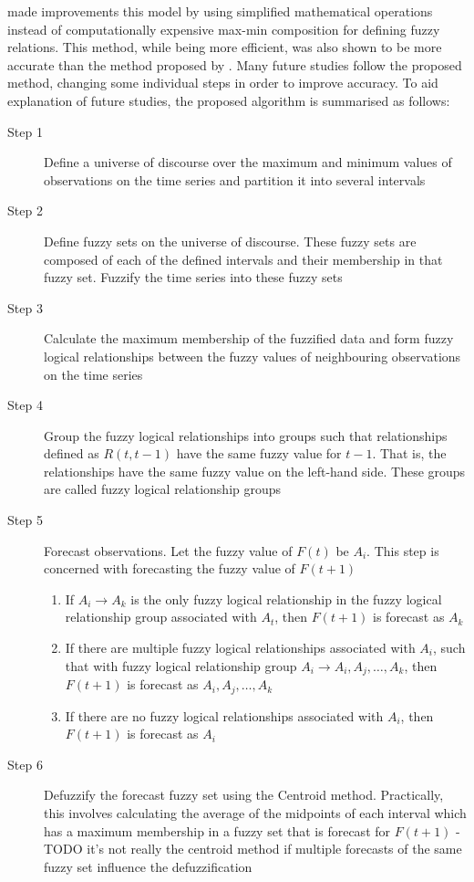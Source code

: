 \documentclass{article}
\theoremstyle{definition}
\begin{document}
\cite{chen1996forecasting} made improvements this model by using simplified mathematical operations instead of computationally expensive max-min composition for defining fuzzy relations. This method, while being more efficient, was also shown to be more accurate than the method proposed by \cite{song1993forecasting}. Many future studies follow the proposed method, changing some individual steps in order to improve accuracy. To aid explanation of future studies, the proposed algorithm is summarised as follows:

\begin{description}
\item[Step 1] Define a universe of discourse over the maximum and minimum values of observations on the time series and partition it into several intervals
\item[Step 2] Define fuzzy sets on the universe of discourse. These fuzzy sets are composed of each of the defined intervals and their membership in that fuzzy set. Fuzzify the time series into these fuzzy sets
\item[Step 3] Calculate the maximum membership of the fuzzified data and form fuzzy logical relationships between the fuzzy values of neighbouring observations on the time series
\item[Step 4] Group the fuzzy logical relationships into groups such that relationships defined as $R(t,t-1)$ have the same fuzzy value for $t-1$. That is, the relationships have the same fuzzy value on the left-hand side. These groups are called fuzzy logical relationship groups
\item[Step 5] Forecast observations. Let the fuzzy value of $F(t)$ be $A_i$. This step is concerned with forecasting the fuzzy value of $F(t+1)$
\begin{enumerate}
\item If  $A_i \rightarrow A_k$ is the only fuzzy logical relationship in the fuzzy logical relationship group associated with $A_t$, then $F(t+1)$ is forecast as $A_k$ 
\item If there are multiple fuzzy logical relationships associated with $A_i$, such that with fuzzy logical relationship group $A_i \rightarrow A_{i}, A_{j}, \ldots, A_{k}$, then $F(t+1)$ is forecast as $A_{i}, A_{j}, \ldots, A_{k}$
\item If there are no fuzzy logical relationships associated with $A_i$, then $F(t+1)$ is forecast as $A_i$
\end{enumerate}
\item[Step 6] Defuzzify the forecast fuzzy set using the Centroid method. Practically, this involves calculating the average of the midpoints of each interval which has a maximum membership in a fuzzy set that is forecast for $F(t+1)$ - TODO it's not really the centroid method if multiple forecasts of the same fuzzy set influence the defuzzification
\end{description}
\end{document}
